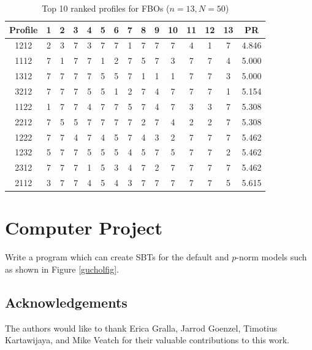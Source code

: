 \documentclass{SBCbookchapter}
\begin{document}
\begin{table}[!htpb]
\scriptsize
\centering
\begin{tabular}{c|ccccc|ccccc|ccc|c}
Profile& 1 & 2 & 3 & 4 & 5 & 6&7&8&9&10&11&12&13&PR\\\hline
1212& 2&	3&	7&	3&	7&	7&	1&	7&	7&	7&	4&	1&	7&	4.846\\
1112&7	&1	&7	&7	&1	&2	&7	&5	&7	&3	&7	&7	&4	&5.000\\
1312&7	&7	&7	&7	&5	&5	&7	&1	&1	&1	&7	&7	&3	&5.000\\
3212&7	&7	&7	&5	&5	&1	&2	&7	&4	&7	&7	&7	&1	&5.154\\
1122&1	&7	&7	&4	&7	&7	&5	&7	&4	&7	&3	&3	&7	&5.308\\
2212&7	&5	&5	&7	&7	&7	&7	&2	&7	&4	&2	&2	&7	&5.308\\
1222&7	&7	&4	&7	&4	&5	&7	&4	&3	&2	&7	&7	&7	&5.462\\
1232&5	&7	&7	&5	&5	&5	&4	&5	&7	&5	&7	&7	&2	&5.462\\
2312&7	&7	&7	&1	&5	&3	&4	&7	&2	&7	&7	&7	&7	&5.462\\
2112&3	&7	&7	&4	&5	&4	&3	&7	&7	&7	&7	&7	&5	&5.615\\\hline
\end{tabular}
\caption{{\small Top 10 ranked profiles for FBOs ($n=13,N=50$) }   }
\label{Tab13}
\end{table}

 



\section{Computer Project}
Write a program which can create SBTs for the default and $p$-norm models such as shown in Figure \ref{gucholfig}.





\subsection*{Acknowledgements}

The authors would like to thank
Erica Gralla, Jarrod Goenzel, Timotius Kartawijaya, and Mike Veatch for their valuable contributions to this work.
\end{document}
